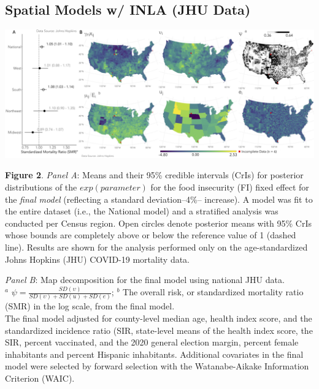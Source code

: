 \documentclass{beamer}
\begin{document}
 \subsection{Spatial Models w/ INLA (JHU Data)}
\begin{frame}
	
	
	
	\vspace*{-0.04 cm}
	\hspace*{-0.45 cm}
	\includegraphics[scale=0.152]{images-logos/combo-forest-map-decomp-jhu.png}
	
	\raggedright
	\tiny{\textbf{Figure 2}. \textit{Panel A}: Means and their 95\% credible intervals (CrIs) for posterior distributions of the $exp(parameter)$ for the food insecurity (FI) fixed effect for the \textit{final model} (reflecting a standard deviation--4\%-- increase). A model was fit to the entire dataset (i.e., the National model) and a stratified analysis was conducted per Census region. Open circles denote posterior means with 95\% CrIs whose bounds are completely above or below the reference value of 1 (dashed line). Results are shown for the analysis performed only on the age-standardized Johns Hopkins (JHU) COVID-19 mortality data. 
		
		\vspace{0.25cm}
		
		\textit{Panel B}: Map decomposition for the final model using national JHU data.\\
		$^a$ $\psi=\frac{SD(\upsilon)}{SD(\upsilon)+SD(u)+SD(e)}$;
		$^b$ The overall risk, or standardized mortality ratio (SMR) in the log scale, from the final model.\\
		The final model adjusted for county-level median age, health index score, and the standardized incidence ratio (SIR, state-level means of the health index score, the SIR, percent vaccinated, and the 2020 general election margin, percent female inhabitants and percent Hispanic inhabitants. Additional covariates in the final model were selected by forward selection with the Watanabe-Aikake Information Criterion (WAIC).}
	
	
\end{frame}
\end{document}
